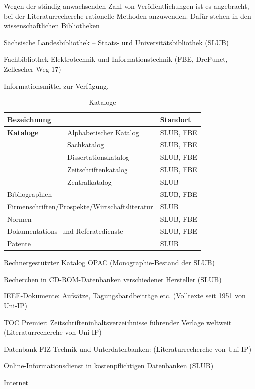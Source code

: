 Wegen der ständig anwachsenden Zahl von Veröffentlichungen ist es angebracht, bei der Literaturrecherche rationelle Methoden anzuwenden.
Dafür stehen in den wissenschaftlichen Bibliotheken
\begin{compactitem}
  \item Sächsische Landesbibliothek -- Staats- und Universitätsbibliothek (SLUB)
  \item Fachbibliothek Elektrotechnik und Informationstechnik (FBE, DrePunct, Zellescher Weg 17)
\end{compactitem}
Informationsmittel zur Verfügung.

\begin{table}[h]
  \centering
  \caption{Kataloge}
  \label{tab:Kataloge}
  \begin{tabular}{lll}%
    \toprule
    Bezeichnung     &                                                   & Standort  \\
    \midrule
    {\bf Kataloge}  & Alphabetischer Katalog                            & SLUB, FBE \\
                    & Sachkatalog                                       & SLUB, FBE \\
                    & Dissertationskatalog                              & SLUB, FBE \\
                    & Zeitschriftenkatalog                              & SLUB, FBE \\
                    & Zentralkatalog                                    & SLUB      \\
    \multicolumn{2}{l}{Bibliographien}                                  & SLUB, FBE \\
    \multicolumn{2}{l}{Firmenschriften/Prospekte/Wirtschaftsliteratur}  & SLUB      \\
    \multicolumn{2}{l}{Normen}                                          & SLUB, FBE \\
    \multicolumn{2}{l}{Dokumentations- und Referatedienste}             & SLUB, FBE \\
    \multicolumn{2}{l}{Patente}                                         & SLUB\\
    \bottomrule
  \end{tabular}
\end{table}

\begin{compactitem}
  \item Rechnergestützter Katalog OPAC (Monographie-Bestand der SLUB)
  \item Recherchen in CD-ROM-Datenbanken verschiedener Hersteller (SLUB)
  \item IEEE-Dokumente: Aufsätze, Tagungsbandbeiträge etc. (Volltexte seit 1951 von Uni-IP)
  \item TOC Premier: Zeitschrifteninhaltsverzeichnisse führender Verlage weltweit (Literaturrecherche von Uni-IP)
  \item Datenbank FIZ Technik und Unterdatenbanken: (Literaturrecherche von Uni-IP)
  \item Online-Informationsdienst in kostenpflichtigen Datenbanken (SLUB)
  \item Internet
\end{compactitem}